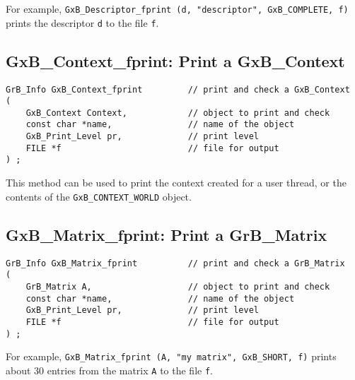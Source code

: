 \documentclass[12pt]{article}
\begin{document}
For example,
\verb'GxB_Descriptor_fprint (d, "descriptor", GxB_COMPLETE, f)'
prints the descriptor \verb'd' to the file \verb'f'.

\subsection{{\sf GxB\_Context\_fprint:} Print a {\sf GxB\_Context}}
\label{context_print}

\begin{mdframed}[userdefinedwidth=6in]
{\footnotesize
\begin{verbatim}
GrB_Info GxB_Context_fprint         // print and check a GxB_Context
(
    GxB_Context Context,            // object to print and check
    const char *name,               // name of the object
    GxB_Print_Level pr,             // print level
    FILE *f                         // file for output
) ;
\end{verbatim} } \end{mdframed}

This method can be used to print the context created for a user thread,
or the contents of the \verb'GxB_CONTEXT_WORLD' object.

\subsection{{\sf GxB\_Matrix\_fprint:} Print a {\sf GrB\_Matrix}}

\begin{mdframed}[userdefinedwidth=6in]
{\footnotesize
\begin{verbatim}
GrB_Info GxB_Matrix_fprint          // print and check a GrB_Matrix
(
    GrB_Matrix A,                   // object to print and check
    const char *name,               // name of the object
    GxB_Print_Level pr,             // print level
    FILE *f                         // file for output
) ;
\end{verbatim} } \end{mdframed}

For example, \verb'GxB_Matrix_fprint (A, "my matrix", GxB_SHORT, f)'
prints about 30 entries from the matrix \verb'A' to the file \verb'f'.
\end{document}
